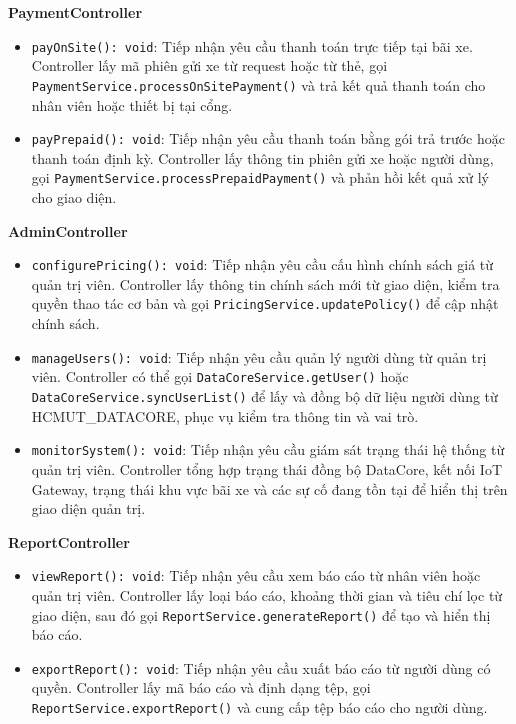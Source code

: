 \noindent\textbf{PaymentController}
\begin{itemize}
    \item \texttt{payOnSite(): void}: Tiếp nhận yêu cầu thanh toán trực tiếp tại bãi xe. Controller lấy mã phiên gửi xe từ request hoặc từ thẻ, gọi \texttt{PaymentService.processOnSitePayment()} và trả kết quả thanh toán cho nhân viên hoặc thiết bị tại cổng.
    \item \texttt{payPrepaid(): void}: Tiếp nhận yêu cầu thanh toán bằng gói trả trước hoặc thanh toán định kỳ. Controller lấy thông tin phiên gửi xe hoặc người dùng, gọi \texttt{PaymentService.processPrepaidPayment()} và phản hồi kết quả xử lý cho giao diện.
\end{itemize}

\noindent\textbf{AdminController}
\begin{itemize}
    \item \texttt{configurePricing(): void}: Tiếp nhận yêu cầu cấu hình chính sách giá từ quản trị viên. Controller lấy thông tin chính sách mới từ giao diện, kiểm tra quyền thao tác cơ bản và gọi \texttt{PricingService.updatePolicy()} để cập nhật chính sách.
    \item \texttt{manageUsers(): void}: Tiếp nhận yêu cầu quản lý người dùng từ quản trị viên. Controller có thể gọi \texttt{DataCoreService.getUser()} hoặc \texttt{DataCoreService.syncUserList()} để lấy và đồng bộ dữ liệu người dùng từ \mbox{HCMUT\_DATACORE}, phục vụ kiểm tra thông tin và vai trò.
    \item \texttt{monitorSystem(): void}: Tiếp nhận yêu cầu giám sát trạng thái hệ thống từ quản trị viên. Controller tổng hợp trạng thái đồng bộ DataCore, kết nối IoT Gateway, trạng thái khu vực bãi xe và các sự cố đang tồn tại để hiển thị trên giao diện quản trị.
\end{itemize}

\noindent\textbf{ReportController}
\begin{itemize}
    \item \texttt{viewReport(): void}: Tiếp nhận yêu cầu xem báo cáo từ nhân viên hoặc quản trị viên. Controller lấy loại báo cáo, khoảng thời gian và tiêu chí lọc từ giao diện, sau đó gọi \texttt{ReportService.generateReport()} để tạo và hiển thị báo cáo.
    \item \texttt{exportReport(): void}: Tiếp nhận yêu cầu xuất báo cáo từ người dùng có quyền. Controller lấy mã báo cáo và định dạng tệp, gọi \texttt{ReportService.exportReport()} và cung cấp tệp báo cáo cho người dùng.
\end{itemize}

